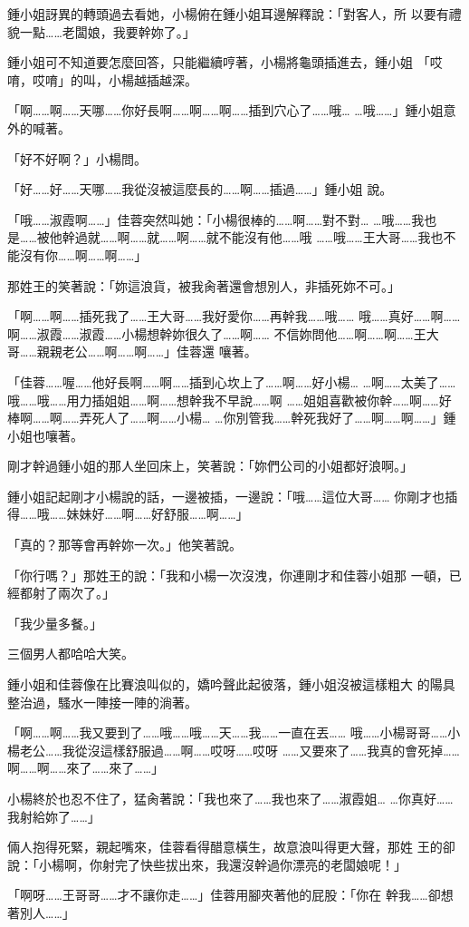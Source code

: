 鍾小姐訝異的轉頭過去看她，小楊俯在鍾小姐耳邊解釋說：「對客人，所
以要有禮貌一點……老闆娘，我要幹妳了。」

鍾小姐可不知道要怎麼回答，只能繼續哼著，小楊將龜頭插進去，鍾小姐
「哎唷，哎唷」的叫，小楊越插越深。

「啊……啊……天哪……你好長啊……啊……啊……插到穴心了……哦…
…哦……」鍾小姐意外的喊著。

「好不好啊？」小楊問。

「好……好……天哪……我從沒被這麼長的……啊……插過……」鍾小姐
說。

「哦……淑霞啊……」佳蓉突然叫她：「小楊很棒的……啊……對不對…
…哦……我也是……被他幹過就……啊……就……啊……就不能沒有他……哦
……哦……王大哥……我也不能沒有你……啊……啊……」

那姓王的笑著說：「妳這浪貨，被我肏著還會想別人，非插死妳不可。」

「啊……啊……插死我了……王大哥……我好愛你……再幹我……哦……
哦……真好……啊……啊……淑霞……淑霞……小楊想幹妳很久了……啊……
不信妳問他……啊……啊……王大哥……親親老公……啊……啊……」佳蓉還
嚷著。

「佳蓉……喔……他好長啊……啊……插到心坎上了……啊……好小楊…
…啊……太美了……哦……哦……用力插姐姐……啊……想幹我不早說……啊
……姐姐喜歡被你幹……啊……好棒啊……啊……弄死人了……啊……小楊…
…你別管我……幹死我好了……啊……啊……」鍾小姐也嚷著。

剛才幹過鍾小姐的那人坐回床上，笑著說：「妳們公司的小姐都好浪啊。」

鍾小姐記起剛才小楊說的話，一邊被插，一邊說：「哦……這位大哥……
你剛才也插得……哦……妹妹好……啊……好舒服……啊……」

「真的？那等會再幹妳一次。」他笑著說。

「你行嗎？」那姓王的說：「我和小楊一次沒洩，你連剛才和佳蓉小姐那
一頓，已經都射了兩次了。」

「我少量多餐。」

三個男人都哈哈大笑。

鍾小姐和佳蓉像在比賽浪叫似的，嬌吟聲此起彼落，鍾小姐沒被這樣粗大
的陽具整治過，騷水一陣接一陣的淌著。

「啊……啊……我又要到了……哦……哦……天……我……一直在丟……
哦……小楊哥哥……小楊老公……我從沒這樣舒服過……啊……哎呀……哎呀
……又要來了……我真的會死掉……啊……啊……來了……來了……」

小楊終於也忍不住了，猛肏著說：「我也來了……我也來了……淑霞姐…
…你真好……我射給妳了……」

倆人抱得死緊，親起嘴來，佳蓉看得醋意橫生，故意浪叫得更大聲，那姓
王的卻說：「小楊啊，你射完了快些拔出來，我還沒幹過你漂亮的老闆娘呢！」

「啊呀……王哥哥……才不讓你走……」佳蓉用腳夾著他的屁股：「你在
幹我……卻想著別人……」

